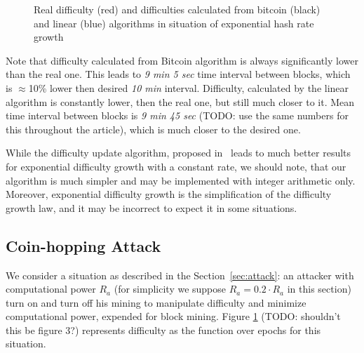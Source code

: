 \documentclass[]{llncs}
\newcommand{\AttackName}{Coin-hopping Attack}
\begin{document}
\begin{figure}[h]
\caption{Real difficulty (red) and difficulties calculated from bitcoin (black) and linear (blue) algorithms in situation of exponential hash rate growth}
\label{fig:exp}
\end{figure}

Note that difficulty calculated from Bitcoin algorithm is always significantly lower than the real one.
This leads to \textit{9 min 5 sec} time interval between blocks, which is $\approx$10\% lower then desired \textit{10 min} interval.
Difficulty, calculated by the linear algorithm is constantly lower, then the real one, but still much closer to it.
Mean time interval between blocks is \textit{9 min 45 sec} (TODO: use the same numbers for this throughout the article), which is much closer to the desired one.

While the difficulty update algorithm, proposed in~\cite{kraft2015difficulty} leads to much better results for exponential difficulty growth with a constant rate, we should note, that our algorithm is much simpler and may be implemented with integer arithmetic only.
Moreover, exponential difficulty growth is the simplification of the difficulty growth law, and it may be incorrect to expect it in some situations.

\subsection{\AttackName}

We consider a situation as described in the Section~\ref{sec:attack}: an attacker with computational power \(R_a\) (for simplicity we suppose \(R_a=0.2 \cdot R_a \) in this section) turn on and turn off his mining to manipulate difficulty and minimize computational power, expended for block mining.
Figure \ref{fig:exp} (TODO: shouldn't this be figure 3?) represents difficulty as the function over epochs for this situation.
\end{document}
